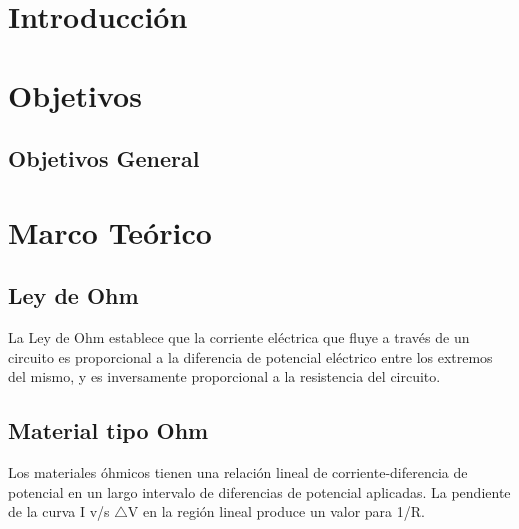 \documentclass[10pt]{article}
\begin{document}
\begin{multicols}{2}

\section{Introducción}


\section{Objetivos}

\subsection{Objetivos General}



	\section{Marco Teórico}

	\subsection*{Ley de Ohm}

	La Ley de Ohm establece que la corriente eléctrica que fluye a través de un
	circuito es proporcional a la diferencia de potencial eléctrico entre los
	extremos del mismo, y es inversamente proporcional a la resistencia del
	circuito.~\cite{LeyDeOhm}

	\subsection*{Material tipo Ohm}

	Los materiales óhmicos tienen una relación lineal de corriente-diferencia de
	potencial en un largo intervalo de diferencias de potencial aplicadas.
	La pendiente de la curva I v/s $\triangle$V en la región lineal produce un
	valor para 1/R.~\cite{MaterialesOhmicos}


\end{multicols}
\end{document}
